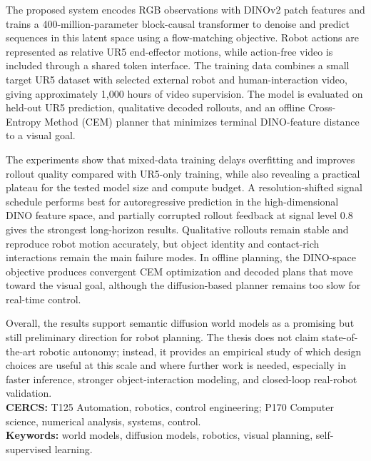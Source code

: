 \documentclass[12pt]{report}
\begin{document}
The proposed system encodes RGB observations with DINOv2 patch features and trains a 400-million-parameter block-causal transformer to denoise and predict sequences in this latent space using a flow-matching objective. Robot actions are represented as relative UR5 end-effector motions, while action-free video is included through a shared token interface. The training data combines a small target UR5 dataset with selected external robot and human-interaction video, giving approximately 1{,}000 hours of video supervision. The model is evaluated on held-out UR5 prediction, qualitative decoded rollouts, and an offline Cross-Entropy Method (CEM) planner that minimizes terminal DINO-feature distance to a visual goal.

The experiments show that mixed-data training delays overfitting and improves rollout quality compared with UR5-only training, while also revealing a practical plateau for the tested model size and compute budget. A resolution-shifted signal schedule performs best for autoregressive prediction in the high-dimensional DINO feature space, and partially corrupted rollout feedback at signal level 0.8 gives the strongest long-horizon results. Qualitative rollouts remain stable and reproduce robot motion accurately, but object identity and contact-rich interactions remain the main failure modes. In offline planning, the DINO-space objective produces convergent CEM optimization and decoded plans that move toward the visual goal, although the diffusion-based planner remains too slow for real-time control.

Overall, the results support semantic diffusion world models as a promising but still preliminary direction for robot planning. The thesis does not claim state-of-the-art robotic autonomy; instead, it provides an empirical study of which design choices are useful at this scale and where further work is needed, especially in faster inference, stronger object-interaction modeling, and closed-loop real-robot validation.
\\[5mm]
\textbf{CERCS:} T125 Automation, robotics, control engineering; P170 Computer science, numerical analysis, systems, control.
\\[5mm]
\textbf{Keywords:} world models, diffusion models, robotics, visual planning, self-supervised learning.

\tableofcontents
\listoffigures
\listoftables

\end{document}
